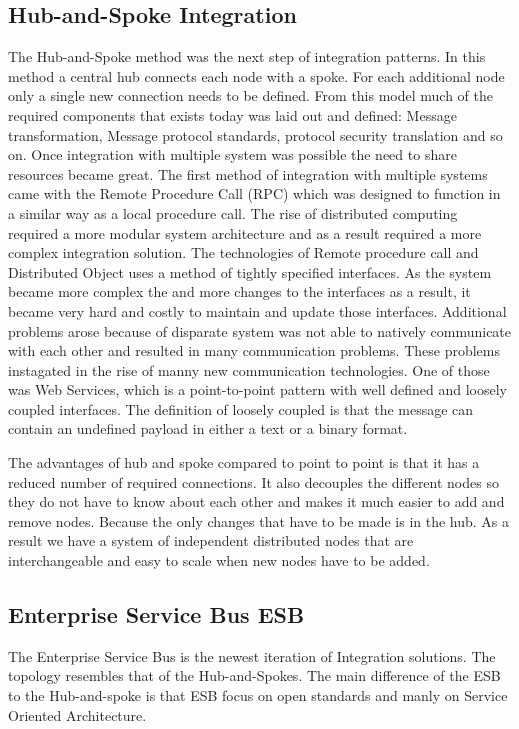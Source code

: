 \documentclass{llncs}
\begin{document}
\subsection{Hub-and-Spoke Integration}
The Hub-and-Spoke method was the next step of integration patterns. In this method a central hub connects each node with a spoke. For each additional node only a single new connection needs to be defined. From this model much of the required components that exists today was laid out and defined: Message transformation, Message protocol standards, protocol security translation and so on. Once integration with multiple system was possible the need to share resources became great. The first method of integration with multiple systems came with the Remote Procedure Call (RPC) which was designed to function in a similar way as a local procedure call. The rise of distributed computing required a more modular system architecture and as a result required a more complex integration solution. The technologies of Remote procedure call and Distributed Object uses a method of tightly specified interfaces. As the system became more complex the and more changes to the interfaces as a result, it became very hard and costly to maintain and update those interfaces. Additional problems arose because of disparate system was not able to natively communicate with each other and resulted in many communication problems. These problems instagated in the rise of manny new communication technologies. One of those was Web Services, which is a point-to-point pattern with well defined and loosely coupled interfaces. The definition of loosely coupled is that the message can contain an undefined payload in either a text or a binary format.

The advantages of hub and spoke compared to point to point is that it has a reduced number of required connections. It also decouples the different nodes so they do not have to know about each other and makes it much easier to add and remove nodes. Because the only changes that have to be made is in the hub. As a result we have a system of independent distributed nodes that are interchangeable and easy to scale when new nodes have to be added.

\subsection{Enterprise Service Bus ESB}
The Enterprise Service Bus is the newest iteration of Integration solutions. The topology resembles that of the Hub-and-Spokes. The main difference of the ESB to the Hub-and-spoke is that ESB focus on open standards and manly on Service Oriented Architecture.
\end{document}
